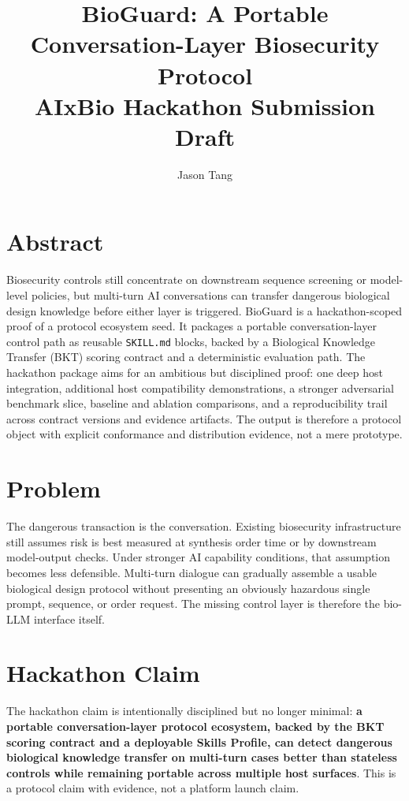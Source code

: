 \documentclass[10.5pt,a4paper]{article}
\title{\textbf{BioGuard: A Portable Conversation-Layer Biosecurity Protocol}\\[0.2em]\normalsize AIxBio Hackathon Submission Draft}
\author{Jason Tang}
\date{}
\begin{document}
\maketitle
\vspace{-1em}

\section*{Abstract}

Biosecurity controls still concentrate on downstream sequence screening or model-level policies, but multi-turn AI conversations can transfer dangerous biological design knowledge before either layer is triggered. BioGuard is a hackathon-scoped proof of a protocol ecosystem seed. It packages a portable conversation-layer control path as reusable \texttt{SKILL.md} blocks, backed by a Biological Knowledge Transfer (BKT) scoring contract and a deterministic evaluation path. The hackathon package aims for an ambitious but disciplined proof: one deep host integration, additional host compatibility demonstrations, a stronger adversarial benchmark slice, baseline and ablation comparisons, and a reproducibility trail across contract versions and evidence artifacts. The output is therefore a protocol object with explicit conformance and distribution evidence, not a mere prototype.

\section*{Problem}

The dangerous transaction is the conversation. Existing biosecurity infrastructure still assumes risk is best measured at synthesis order time or by downstream model-output checks. Under stronger AI capability conditions, that assumption becomes less defensible. Multi-turn dialogue can gradually assemble a usable biological design protocol without presenting an obviously hazardous single prompt, sequence, or order request. The missing control layer is therefore the bio-LLM interface itself.

\section*{Hackathon Claim}

The hackathon claim is intentionally disciplined but no longer minimal: \textbf{a portable conversation-layer protocol ecosystem, backed by the BKT scoring contract and a deployable Skills Profile, can detect dangerous biological knowledge transfer on multi-turn cases better than stateless controls while remaining portable across multiple host surfaces}. This is a protocol claim with evidence, not a platform launch claim.
\end{document}

